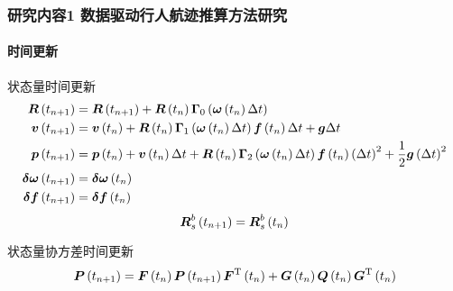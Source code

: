\begin{frame}
	\frametitle{研究内容1 数据驱动行人航迹推算方法研究}
	\framesubtitle{时间更新}
	\begin{block}{状态量时间更新}
		{
			\vspace{-0.4cm}
			{
				\footnotesize
				\begin{align*}
					\vb*{R}\left(t_{n+1}\right) &= \vb*{R}\left(t_{n+1}\right) + \vb*{R}\left(t_{n}\right) \vb*{\Gamma}_{0}\left( \vb*{\omega}\left(t_{n}\right) \Delta t \right) \\
					\vb*{v}\left(t_{n+1}\right) &= \vb*{v}\left(t_{n}\right) 
					+ \vb*{R}\left(t_{n}\right) \vb*{\Gamma}_{1}\left( \vb*{\omega}\left(t_{n}\right) \Delta t \right) \vb*{f}\left(t_{n}\right) \Delta t 
					+ \vb*{g}\Delta t \\
					\vb*{p}\left(t_{n+1}\right) &= \vb*{p}\left(t_{n}\right) 
					+ \vb*{v}\left(t_{n}\right) \Delta t
					+ \vb*{R}\left(t_{n}\right) \vb*{\Gamma}_{2}\left( \vb*{\omega}\left(t_{n}\right) \Delta t \right) \vb*{f}\left(t_{n}\right) \left(\Delta t\right)^2 
					+ \frac{1}{2}\vb*{g}\left(\Delta t\right)^2 \\
					\vb*{\delta \omega}\left(t_{n+1}\right) &= \vb*{\delta \omega}\left(t_{n}\right) \\
					\vb*{\delta f}\left(t_{n+1}\right) &= \vb*{\delta f}\left(t_{n}\right)
				\end{align*}
			}
			\vspace{-0.6cm}
			\begin{equation*}
				\vb*{R}_s^b\left(t_{n+1}\right) = \vb*{R}_s^b\left(t_{n}\right) 
			\end{equation*}
		}
	\end{block}
	\begin{block}{状态量协方差时间更新}
		{\footnotesize 		
			\begin{equation*}
				\vb*{P}\left(t_{n+1}\right) = \vb*{F}\left(t_{n}\right) \vb*{P}\left(t_{n+1}\right) \vb*{F}^{\mathrm{T}}\left(t_{n}\right)
				+ \vb*{G}\left(t_{n}\right) \vb*{Q}\left(t_{n}\right) \vb*{G}^{\mathrm{T}}\left(t_{n}\right)
			\end{equation*}
		}
	\end{block} 
\end{frame}

